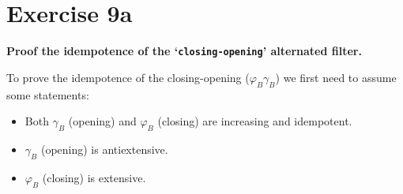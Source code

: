\section*{Exercise 9a}

{
\bfseries
Proof the idempotence of the `\texttt{closing-opening}' alternated filter.
}

To prove the idempotence of the closing-opening ($\varphi_B\gamma_B$) we first need to assume some statements:
\begin{itemize}
    \item Both $\gamma_B$ (opening) and $\varphi_B$ (closing) are increasing and idempotent.
    \item $\gamma_B$ (opening) is antiextensive.
    \item $\varphi_B$ (closing) is extensive.
\end{itemize}

\newtheorem{thm}{Theorem}

\phantom{a}

